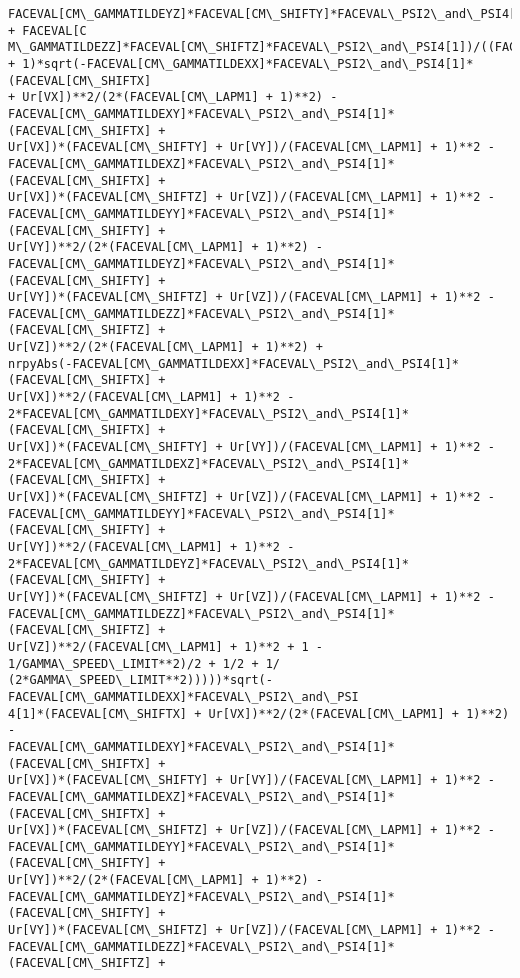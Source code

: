 \documentclass[landscape,letterpaper,10pt,english]{article}
\begin{document}
\begin{Verbatim}[commandchars=\\\{\}]
FACEVAL[CM\_GAMMATILDEYZ]*FACEVAL[CM\_SHIFTY]*FACEVAL\_PSI2\_and\_PSI4[1] + FACEVAL[C
M\_GAMMATILDEZZ]*FACEVAL[CM\_SHIFTZ]*FACEVAL\_PSI2\_and\_PSI4[1])/((FACEVAL[CM\_LAPM1]
+ 1)*sqrt(-FACEVAL[CM\_GAMMATILDEXX]*FACEVAL\_PSI2\_and\_PSI4[1]*(FACEVAL[CM\_SHIFTX]
+ Ur[VX])**2/(2*(FACEVAL[CM\_LAPM1] + 1)**2) -
FACEVAL[CM\_GAMMATILDEXY]*FACEVAL\_PSI2\_and\_PSI4[1]*(FACEVAL[CM\_SHIFTX] +
Ur[VX])*(FACEVAL[CM\_SHIFTY] + Ur[VY])/(FACEVAL[CM\_LAPM1] + 1)**2 -
FACEVAL[CM\_GAMMATILDEXZ]*FACEVAL\_PSI2\_and\_PSI4[1]*(FACEVAL[CM\_SHIFTX] +
Ur[VX])*(FACEVAL[CM\_SHIFTZ] + Ur[VZ])/(FACEVAL[CM\_LAPM1] + 1)**2 -
FACEVAL[CM\_GAMMATILDEYY]*FACEVAL\_PSI2\_and\_PSI4[1]*(FACEVAL[CM\_SHIFTY] +
Ur[VY])**2/(2*(FACEVAL[CM\_LAPM1] + 1)**2) -
FACEVAL[CM\_GAMMATILDEYZ]*FACEVAL\_PSI2\_and\_PSI4[1]*(FACEVAL[CM\_SHIFTY] +
Ur[VY])*(FACEVAL[CM\_SHIFTZ] + Ur[VZ])/(FACEVAL[CM\_LAPM1] + 1)**2 -
FACEVAL[CM\_GAMMATILDEZZ]*FACEVAL\_PSI2\_and\_PSI4[1]*(FACEVAL[CM\_SHIFTZ] +
Ur[VZ])**2/(2*(FACEVAL[CM\_LAPM1] + 1)**2) +
nrpyAbs(-FACEVAL[CM\_GAMMATILDEXX]*FACEVAL\_PSI2\_and\_PSI4[1]*(FACEVAL[CM\_SHIFTX] +
Ur[VX])**2/(FACEVAL[CM\_LAPM1] + 1)**2 -
2*FACEVAL[CM\_GAMMATILDEXY]*FACEVAL\_PSI2\_and\_PSI4[1]*(FACEVAL[CM\_SHIFTX] +
Ur[VX])*(FACEVAL[CM\_SHIFTY] + Ur[VY])/(FACEVAL[CM\_LAPM1] + 1)**2 -
2*FACEVAL[CM\_GAMMATILDEXZ]*FACEVAL\_PSI2\_and\_PSI4[1]*(FACEVAL[CM\_SHIFTX] +
Ur[VX])*(FACEVAL[CM\_SHIFTZ] + Ur[VZ])/(FACEVAL[CM\_LAPM1] + 1)**2 -
FACEVAL[CM\_GAMMATILDEYY]*FACEVAL\_PSI2\_and\_PSI4[1]*(FACEVAL[CM\_SHIFTY] +
Ur[VY])**2/(FACEVAL[CM\_LAPM1] + 1)**2 -
2*FACEVAL[CM\_GAMMATILDEYZ]*FACEVAL\_PSI2\_and\_PSI4[1]*(FACEVAL[CM\_SHIFTY] +
Ur[VY])*(FACEVAL[CM\_SHIFTZ] + Ur[VZ])/(FACEVAL[CM\_LAPM1] + 1)**2 -
FACEVAL[CM\_GAMMATILDEZZ]*FACEVAL\_PSI2\_and\_PSI4[1]*(FACEVAL[CM\_SHIFTZ] +
Ur[VZ])**2/(FACEVAL[CM\_LAPM1] + 1)**2 + 1 - 1/GAMMA\_SPEED\_LIMIT**2)/2 + 1/2 + 1/
(2*GAMMA\_SPEED\_LIMIT**2)))))*sqrt(-FACEVAL[CM\_GAMMATILDEXX]*FACEVAL\_PSI2\_and\_PSI
4[1]*(FACEVAL[CM\_SHIFTX] + Ur[VX])**2/(2*(FACEVAL[CM\_LAPM1] + 1)**2) -
FACEVAL[CM\_GAMMATILDEXY]*FACEVAL\_PSI2\_and\_PSI4[1]*(FACEVAL[CM\_SHIFTX] +
Ur[VX])*(FACEVAL[CM\_SHIFTY] + Ur[VY])/(FACEVAL[CM\_LAPM1] + 1)**2 -
FACEVAL[CM\_GAMMATILDEXZ]*FACEVAL\_PSI2\_and\_PSI4[1]*(FACEVAL[CM\_SHIFTX] +
Ur[VX])*(FACEVAL[CM\_SHIFTZ] + Ur[VZ])/(FACEVAL[CM\_LAPM1] + 1)**2 -
FACEVAL[CM\_GAMMATILDEYY]*FACEVAL\_PSI2\_and\_PSI4[1]*(FACEVAL[CM\_SHIFTY] +
Ur[VY])**2/(2*(FACEVAL[CM\_LAPM1] + 1)**2) -
FACEVAL[CM\_GAMMATILDEYZ]*FACEVAL\_PSI2\_and\_PSI4[1]*(FACEVAL[CM\_SHIFTY] +
Ur[VY])*(FACEVAL[CM\_SHIFTZ] + Ur[VZ])/(FACEVAL[CM\_LAPM1] + 1)**2 -
FACEVAL[CM\_GAMMATILDEZZ]*FACEVAL\_PSI2\_and\_PSI4[1]*(FACEVAL[CM\_SHIFTZ] +

\end{Verbatim}
\end{document}
